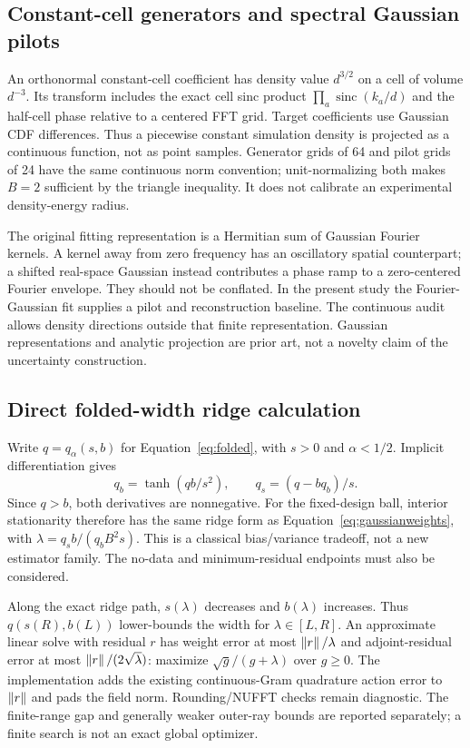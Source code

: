 \subsection{Constant-cell generators and spectral Gaussian pilots}
An orthonormal constant-cell coefficient has density value $d^{3/2}$ on a
cell of volume $d^{-3}$. Its transform includes the exact cell sinc product
$\prod_a\operatorname{sinc}(k_a/d)$ and the half-cell phase relative to a
centered FFT grid. Target coefficients use Gaussian CDF differences. Thus
a piecewise constant simulation density is projected as a continuous
function, not as point samples. Generator grids of 64 and pilot grids of
24 have the same continuous norm convention; unit-normalizing both makes
$B=2$ sufficient by the triangle inequality. It does not calibrate an
experimental density-energy radius.

The original fitting representation is a Hermitian sum of Gaussian Fourier
kernels. A kernel away from zero frequency has an oscillatory spatial
counterpart; a shifted real-space Gaussian instead contributes a phase ramp
to a zero-centered Fourier envelope. They should not be conflated. In the
present study the Fourier-Gaussian fit supplies a pilot and reconstruction
baseline. The continuous audit allows density directions outside that
finite representation. Gaussian representations and analytic projection
are prior art, not a novelty claim of the uncertainty construction.

\subsection{Direct folded-width ridge calculation}
Write $q=q_\alpha(s,b)$ for Equation~\eqref{eq:folded}, with $s>0$ and
$\alpha<1/2$. Implicit differentiation gives
\begin{equation}
q_b=\tanh(qb/s^2),\qquad q_s=(q-bq_b)/s.
\end{equation}
Since $q>b$, both derivatives are nonnegative. For the fixed-design ball,
interior stationarity therefore has the same ridge form as
Equation~\eqref{eq:gaussianweights}, with
$\lambda=q_s b/(q_b B^2s)$. This is a classical bias/variance tradeoff,
not a new estimator family. The no-data and minimum-residual endpoints
must also be considered.

Along the exact ridge path, $s(\lambda)$ decreases and $b(\lambda)$
increases. Thus $q(s(R),b(L))$ lower-bounds the width for
$\lambda\in[L,R]$. An approximate linear solve with residual $r$ has
weight error at most $\left\|r\right\|/\lambda$ and adjoint-residual error at most
$\left\|r\right\|/(2\sqrt\lambda)$: maximize $\sqrt g/(g+\lambda)$ over $g\ge0$.
The implementation adds the existing continuous-Gram quadrature action
error to $\left\|r\right\|$ and pads the field norm. Rounding/NUFFT checks remain
diagnostic. The finite-range gap and generally weaker outer-ray bounds
are reported separately; a finite search is not an exact global optimizer.

